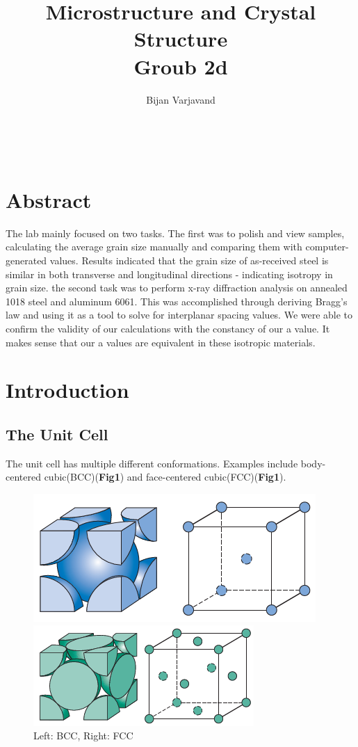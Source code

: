 \documentclass{article}
\author{Bijan Varjavand}
\title{Microstructure and Crystal Structure\\Groub 2d}
\begin{document}
\maketitle
\ \\[2.5in]

\section{Abstract}
\centering
The lab mainly focused on two tasks. The first was to polish and view samples, calculating the average grain size manually and comparing them with computer-generated values. Results indicated that the grain size of as-received steel is similar in both transverse and longitudinal directions - indicating isotropy in grain size. the second task was to perform x-ray diffraction analysis on annealed 1018 steel and aluminum 6061. This was accomplished through deriving Bragg's law and using it as a tool to solve for interplanar spacing values. We were able to confirm the validity of our calculations with the constancy of our a value. It makes sense that our a values are equivalent in these isotropic materials.

\clearpage

\raggedright
\section{Introduction}

\subsection{The Unit Cell}

The unit cell has multiple different conformations. Examples include body-centered cubic(BCC)(\textbf{Fig1}) and face-centered cubic(FCC)(\textbf{Fig1}).

\begin{figure}[h]
	\begin{minipage}{0.5\textwidth}
		\centering
		\includegraphics[scale=.5]{bcc.png}
	\end{minipage}
	\begin{minipage}{0.5\textwidth}
		\centering
		\includegraphics[scale=.6]{fcc.png}
	\end{minipage}
	\caption{Left: BCC, Right: FCC}
\end{figure}
\end{document}
